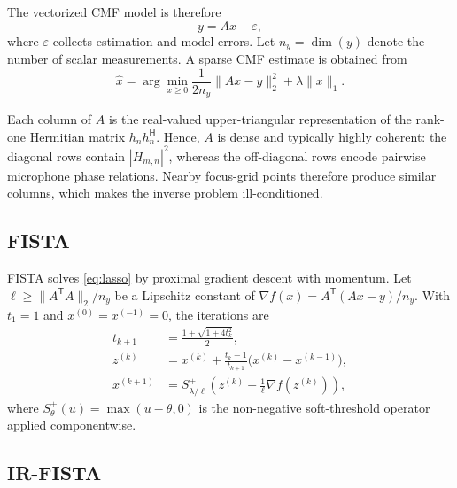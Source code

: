 \documentclass[peer-review]{fa2026}
\begin{document}
The vectorized CMF model is therefore
\begin{equation}
    y = A x + \varepsilon ,
\end{equation}
where $\varepsilon$ collects estimation and model errors. Let $n_y=\dim(y)$
denote the number of scalar measurements. A sparse CMF estimate is obtained from
\begin{equation}
    \hat{x} =
    \arg\min_{x \geq 0}
    \frac{1}{2n_y}\|A x - y\|_2^2 + \lambda \|x\|_1 .
    \label{eq:lasso}
\end{equation}

Each column of $A$ is the real-valued upper-triangular representation of the rank-one Hermitian matrix $h_n h_n^\mathsf{H}$. Hence, $A$ is dense and typically highly coherent: the diagonal rows contain $|H_{m,n}|^2$, whereas the off-diagonal rows encode pairwise microphone phase relations. Nearby focus-grid points therefore produce similar columns, which makes the inverse problem ill-conditioned.

\subsection{FISTA}

FISTA solves \cref{eq:lasso} by proximal gradient descent with momentum.
Let $\ell \geq \|A^\mathsf{T}A\|_2/n_y$ be a Lipschitz constant of
$\nabla f(x)=A^\mathsf{T}(Ax-y)/n_y$.
With $t_1=1$ and $x^{(0)}=x^{(-1)}=0$, the iterations are
\begin{align}
    t_{k+1} &= \frac{1+\sqrt{1+4t_k^2}}{2}, \\
    z^{(k)} &= x^{(k)} + \frac{t_k-1}{t_{k+1}}\bigl(x^{(k)}-x^{(k-1)}\bigr), \\
    x^{(k+1)} &= S^+_{\lambda/\ell}\!\left(z^{(k)} - \tfrac{1}{\ell}\nabla f(z^{(k)})\right),
\end{align}
where $S^+_\theta(u)=\max(u-\theta,0)$ is the non-negative soft-threshold operator applied componentwise.

\subsection{IR-FISTA}
\end{document}

